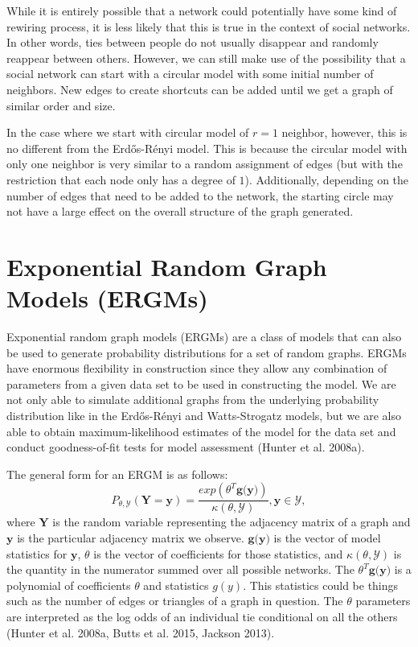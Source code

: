 \documentclass[12pt,twoside]{amherstthesis}
\begin{document}
  While it is entirely possible that a network could potentially have some
  kind of rewiring process, it is less likely that this is true in the
  context of social networks. In other words, ties between people do not
  usually disappear and randomly reappear between others. However, we can
  still make use of the possibility that a social network can start with a
  circular model with some initial number of neighbors. New edges to
  create shortcuts can be added until we get a graph of similar order and
  size.
  
  In the case where we start with circular model of \(r = 1\) neighbor,
  however, this is no different from the Erdős-Rényi model. This is
  because the circular model with only one neighbor is very similar to a
  random assignment of edges (but with the restriction that each node only
  has a degree of \(1\)). Additionally, depending on the number of edges
  that need to be added to the network, the starting circle may not have a
  large effect on the overall structure of the graph generated.
  
  \section{Exponential Random Graph Models
  (ERGMs)}\label{exponential-random-graph-models-ergms}
  
  Exponential random graph models (ERGMs) are a class of models that can
  also be used to generate probability distributions for a set of random
  graphs. ERGMs have enormous flexibility in construction since they allow
  any combination of parameters from a given data set to be used in
  constructing the model. We are not only able to simulate additional
  graphs from the underlying probability distribution like in the
  Erdős-Rényi and Watts-Strogatz models, but we are also able to obtain
  maximum-likelihood estimates of the model for the data set and conduct
  goodness-of-fit tests for model assessment (Hunter et al. 2008a).
  
  The general form for an ERGM is as follows:
  \[P_{\theta, \mathcal{Y}}(\textbf{Y} = \textbf{y}) = \frac {exp(\theta^{T}\textbf{g(y)})} {\kappa(\theta, \mathcal{Y})},\textbf{y} \in \mathcal{Y}, \]
  where \(\textbf{Y}\) is the random variable representing the adjacency
  matrix of a graph and \(\textbf{y}\) is the particular adjacency matrix
  we observe. \(\textbf{g(y)}\) is the vector of model statistics for
  \(\textbf{y}\), \(\theta\) is the vector of coefficients for those
  statistics, and \(\kappa(\theta, \mathcal{Y})\) is the quantity in the
  numerator summed over all possible networks. The
  \(\theta^{T}\textbf{g(y)}\) is a polynomial of coefficients \(\theta\)
  and statistics \(g(y)\). This statistics could be things such as the
  number of edges or triangles of a graph in question. The \(\theta\)
  parameters are interpreted as the log odds of an individual tie
  conditional on all the others (Hunter et al. 2008a, Butts et al. 2015,
  Jackson 2013).
  
\end{document}
